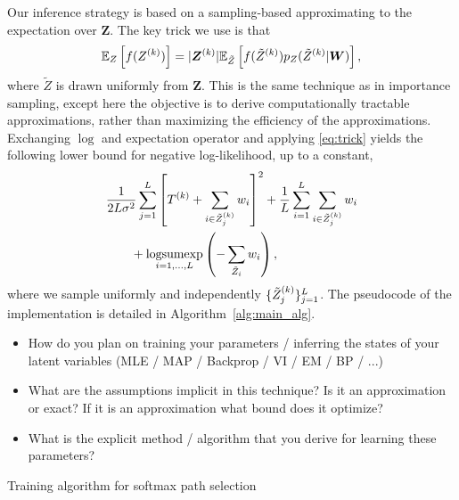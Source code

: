 \documentclass{article}
\begin{document}
Our inference strategy is based on a sampling-based approximating to the expectation over $\bm Z$. The key trick we use is that 
\begin{equation}
\label{eq:trick}
  \mathbb{E}_{Z}\left[{f(Z^{(k)})}\right] = |\bm Z^{(k)}| \mathbb{E}_{\tilde Z}\left[{f(\tilde Z^{(k)})p_Z(\tilde Z^{(k)}|\bm W)}\right],
\end{equation}
where $\tilde Z$ is drawn uniformly from $\bm Z$. This is the same technique as in importance sampling, except here the objective is to derive computationally tractable approximations, rather than maximizing the efficiency of the approximations. Exchanging $\log$ and expectation operator and applying \eqref{eq:trick} yields the following lower bound for negative log-likelihood, up to a constant,
\begin{align}
&\frac{1}{2L\sigma^2}\sum_{j=1}^L \left[{T^{(k)} + \sum_{i\in \tilde Z^{(k)}_j}w_i}\right]^2 + \frac{1}{L}\sum_{i=1}^L\sum_{i\in\tilde Z_{j}^{(k)}}w_i 
\label{eq:softmax_objective}
\\&\qquad + \underset{i=1,\ldots,L}{\text{logsumexp}}\left({-\sum_{\tilde Z_i} w_i}\right) \nonumber,
\end{align}
where we sample uniformly and independently $\{\tilde Z_j^{(k)}\}_{j=1}^L$. The pseudocode of the implementation is detailed in Algorithm~\ref{alg:main_alg}.


{\color{gray}
\begin{itemize}
\item How do you plan on training your parameters / inferring the
  states of your latent variables (MLE / MAP / Backprop / VI / EM / BP / ...)

\item What are the assumptions implicit in this technique? Is it an approximation or exact? If it is an approximation what bound does it optimize?

\item What is the explicit method / algorithm that you derive for learning these parameters?
\end{itemize}

}
\begin{algorithm}
  \begin{algorithmic}
    
      \ENDFOR
  \end{algorithmic}
  \caption{Training algorithm for softmax path selection}
  \label{alg:main_alg}
\end{algorithm}
\end{document}
